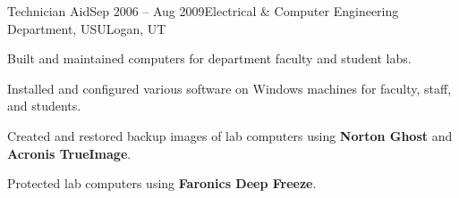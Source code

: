 
\def\PositionTitle{Technician Aid}
\def\PositionPeriod{Sep 2006 -- Aug 2009} %
\def\OrgName{Electrical \& Computer Engineering Department, USU}
\def\OrgLocation{Logan, UT}


\begin{rExperience}{\PositionTitle}{\PositionPeriod}{\OrgName}{\OrgLocation}

  \item Built and maintained computers for department faculty and student labs.

  \item Installed and configured various software on Windows machines for faculty, staff, and students.

  \item Created and restored backup images of lab computers using \textbf{Norton Ghost} and \textbf{Acronis TrueImage}.

  \item Protected lab computers using \textbf{Faronics Deep Freeze}.

\end{rExperience}
